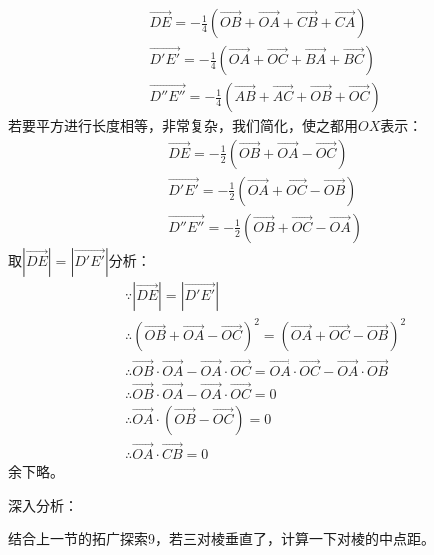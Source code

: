 \begin{align*}
&\overrightarrow{DE}=-\frac{1}{4}\left( \overrightarrow{OB}+\overrightarrow{OA}+\overrightarrow{CB}+\overrightarrow{CA} \right) \\
&\overrightarrow{D'E'}=-\frac{1}{4}\left( \overrightarrow{OA}+\overrightarrow{OC}+\overrightarrow{BA}+\overrightarrow{BC} \right) \\
&\overrightarrow{D''E''}=-\frac{1}{4}\left( \overrightarrow{AB}+\overrightarrow{AC}+\overrightarrow{OB}+\overrightarrow{OC} \right)
\end{align*}
若要平方进行长度相等，非常复杂，我们简化，使之都用$OX$表示：
\begin{align*}
&\overrightarrow{DE}=-\frac{1}{2}\left( \overrightarrow{OB}+\overrightarrow{OA}-\overrightarrow{OC} \right) \\
&\overrightarrow{D'E'}=-\frac{1}{2}\left( \overrightarrow{OA}+\overrightarrow{OC}-\overrightarrow{OB} \right) \\
&\overrightarrow{D''E''}=-\frac{1}{2}\left( \overrightarrow{OB}+\overrightarrow{OC}-\overrightarrow{OA} \right)
\end{align*}
取$\left| \overrightarrow{DE} \right|=\left| \overrightarrow{D'E'} \right|$分析：
\begin{align*}
&\because \left| \overrightarrow{DE} \right|=\left| \overrightarrow{D'E'} \right| \\
&\therefore \left( \overrightarrow{OB}+\overrightarrow{OA}-\overrightarrow{OC} \right) ^2=\left( \overrightarrow{OA}+\overrightarrow{OC}-\overrightarrow{OB} \right) ^2 \\
&\therefore \overrightarrow{OB}\cdot \overrightarrow{OA}-\overrightarrow{OA}\cdot \overrightarrow{OC}=\overrightarrow{OA}\cdot \overrightarrow{OC}-\overrightarrow{OA}\cdot \overrightarrow{OB} \\
&\therefore \overrightarrow{OB}\cdot \overrightarrow{OA}-\overrightarrow{OA}\cdot \overrightarrow{OC}=0 \\
&\therefore \overrightarrow{OA}\cdot \left( \overrightarrow{OB}-\overrightarrow{OC} \right) =0 \\
&\therefore \overrightarrow{OA}\cdot \overrightarrow{CB}=0
\end{align*}
余下略。

深入分析：

结合上一节的拓广探索9，若三对棱垂直了，计算一下对棱的中点距。

